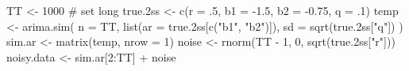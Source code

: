 \begin{Schunk}
\begin{Sinput}
 TT <- 1000 # set long
 true.2ss <- c(r = .5, b1 = -1.5, b2 = -0.75, q = .1)
 temp <- arima.sim(
   n = TT, list(ar = true.2ss[c("b1", "b2")]),
   sd = sqrt(true.2ss["q"])
 )
 sim.ar <- matrix(temp, nrow = 1)
 noise <- rnorm(TT - 1, 0, sqrt(true.2ss["r"]))
 noisy.data <- sim.ar[2:TT] + noise
\end{Sinput}
\end{Schunk}
